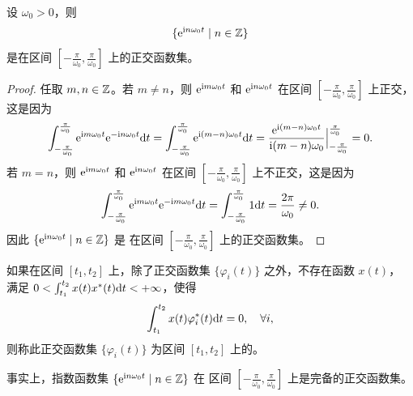 \begin{example}[指数函数集]
    设 $\omega_0 > 0$，则
    \begin{align*}
        \{\mathrm{e}^{\mathrm{i} n\omega_0t} \mid n \in \mathbb{Z}\}
    \end{align*}
    是在区间 $[-\frac{\pi}{\omega_0}, \frac{\pi}{\omega_0}]$ 上的正交函数集。
\end{example}

\begin{proof}
    任取 $m, n \in \mathbb{Z}$。若 $m \neq n$，则 $\mathrm{e}^{\mathrm{i} m\omega_0t}$ 和 $\mathrm{e}^{\mathrm{i} n\omega_0t}$
    在区间 $[-\frac{\pi}{\omega_0}, \frac{\pi}{\omega_0}]$ 上正交，这是因为
    \begin{align*}
        \int_{-\frac{\pi}{\omega_0}}^{\frac{\pi}{\omega_0}}\mathrm{e}^{\mathrm{i} m\omega_0t}\mathrm{e}^{-\mathrm{i} n\omega_0t}\mathrm{d}t
        = \int_{-\frac{\pi}{\omega_0}}^{\frac{\pi}{\omega_0}}\mathrm{e}^{\mathrm{i} (m - n)\omega_0t}\mathrm{d}t
        = \frac{\mathrm{e}^{\mathrm{i} (m - n)\omega_0t}}{\mathrm{i} (m - n)\omega_0}\Big|_{-\frac{\pi}{\omega_0}}^{\frac{\pi}{\omega_0}}
        = 0.
    \end{align*}
    若 $m = n$，则 $\mathrm{e}^{\mathrm{i} m\omega_0t}$ 和 $\mathrm{e}^{\mathrm{i} n\omega_0t}$
    在区间 $[-\frac{\pi}{\omega_0}, \frac{\pi}{\omega_0}]$ 上不正交，这是因为
    \begin{align*}
        \int_{-\frac{\pi}{\omega_0}}^{\frac{\pi}{\omega_0}}\mathrm{e}^{\mathrm{i} m\omega_0t}\mathrm{e}^{-\mathrm{i} m\omega_0t}\mathrm{d}t
        = \int_{-\frac{\pi}{\omega_0}}^{\frac{\pi}{\omega_0}}1\mathrm{d}t
        = \frac{2\pi}{\omega_0} \neq 0.
    \end{align*}
    因此 $\{\mathrm{e}^{\mathrm{i} n\omega_0t} \mid n \in \mathbb{Z}\}$ 是
    在区间 $[-\frac{\pi}{\omega_0}, \frac{\pi}{\omega_0}]$ 上的正交函数集。
\end{proof}

\begin{definition}[完备的正交函数集]
    如果在区间 $[t_1, t_2]$ 上，除了正交函数集 $\{\varphi_i(t)\}$ 之外，不存在函数 $x(t)$，
    满足 $0 < \int_{t_1}^{t_2}x(t)x^*(t)\mathrm{d}t < +\infty$，使得
    \begin{align*}
        \int_{t_1}^{t_2}x(t)\varphi_i^*(t)\mathrm{d}t = 0, \quad \forall i,
    \end{align*}
    则称此正交函数集 $\{\varphi_i(t)\}$ 为区间 $[t_1, t_2]$ 上的。
\end{definition}

\begin{remark}
    事实上，指数函数集 $\{\mathrm{e}^{\mathrm{i} n\omega_0t} \mid n \in \mathbb{Z}\}$ 在
    区间 $[-\frac{\pi}{\omega_0}, \frac{\pi}{\omega_0}]$ 上是完备的正交函数集。
\end{remark}

